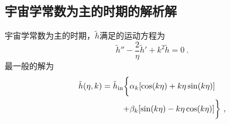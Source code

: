 \subsection{宇宙学常数为主的时期的解析解}
宇宙学常数为主的时期，$\tilde h$满足的运动方程为
\begin{equation}
\tilde h'' - \frac{2}{\eta} \tilde h' + k^2 \tilde h = 0~.
\end{equation}
最一般的解为
\begin{equation}
\begin{aligned}
\tilde h(\eta,k) = \tilde h_{\rm in} \bigg\{ & \alpha_k [\cos(k\eta) + k\eta \sin(k\eta)] \\
+ & \beta_k [\sin(k\eta) - k\eta\cos(k\eta) ] \bigg\}~,
\end{aligned}
\end{equation}


















